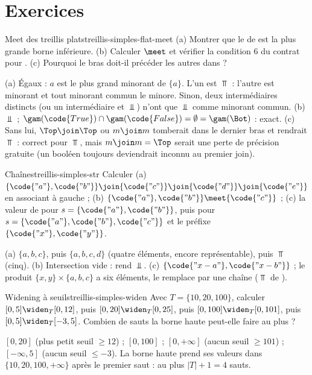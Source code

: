 \section*{Exercices}

\begin{exercice}{Meet des treillis plats}{treillis-simples-flat-meet}
  (a) Montrer que le  de  est la plus grande
  borne inférieure. (b) Calculer  $\meet$  et
  vérifier la condition 6 du contrat pour . (c) Pourquoi le
  bras  doit-il précéder les autres dans
   ?
\end{exercice}
\begin{solution}
  (a) Égaux : $a$ est le plus grand minorant de $\{a\}$. L'un est $\Top$ :
  l'autre est minorant et tout minorant commun le minore. Sinon, deux
  intermédiaires distincts (ou un intermédiaire et $\Bot$) n'ont que $\Bot$
  comme minorant commun. (b) $\Bot$ ; $\gam(\code{True}) \cap
  \gam(\code{False}) = \emptyset = \gam(\Bot)$ : exact. (c) Sans lui,
  $\Top \join \Top$ ou $m \join m$ tomberait dans le dernier bras et rendrait
  $\Top$ : correct pour $\Top$, mais $m \join m = \Top$ serait une perte
  de précision gratuite (un booléen toujours  deviendrait
  inconnu au premier join).
\end{solution}

\begin{exercice}{Chaînes}{treillis-simples-str}
  Calculer (a) $\{\code{"a"},\code{"b"}\} \join \{\code{"c"}\} \join
  \{\code{"d"}\} \join \{\code{"e"}\}$ en associant à gauche ;
  (b) $\{\code{"a"},\code{"b"}\} \meet \{\code{"c"}\}$ ; (c) la valeur de
   pour $s = \{\code{"a"},\code{"b"}\}$, puis pour
  $s = \{\code{"a"},\code{"b"},\code{"c"}\}$ et le préfixe
  $\{\code{"x"},\code{"y"}\}$.
\end{exercice}
\begin{solution}
  (a) $\{a,b,c\}$, puis $\{a,b,c,d\}$ (quatre éléments, encore
  représentable), puis $\Top$ (cinq). (b) Intersection vide :
   rend $\Bot$. (c) $\{\code{"x-a"}, \code{"x-b"}\}$ ; le
  produit $\{x,y\} \times \{a,b,c\}$ a six éléments,  le
  remplace par \og une chaîne\fg{} ($\Top$ de ).
\end{solution}

\begin{exercice}{Widening à seuils}{treillis-simples-widen}
  Avec $T = \{10, 20, 100\}$, calculer $[0,5] \widen_T [0,12]$, puis
  $[0,20] \widen_T [0,25]$, puis $[0,100] \widen_T [0,101]$, puis
  $[0,5] \widen_T [-3,5]$. Combien de sauts la borne haute peut-elle faire au
  plus ?
\end{exercice}
\begin{solution}
  $[0,20]$ (plus petit seuil $\ge 12$) ; $[0,100]$ ; $[0,+\infty]$ (aucun
  seuil $\ge 101$) ; $[-\infty, 5]$ (aucun seuil $\le -3$). La borne haute
  prend ses valeurs dans $\{10, 20, 100, +\infty\}$ après le premier saut :
  au plus $|T| + 1 = 4$ sauts.
\end{solution}

